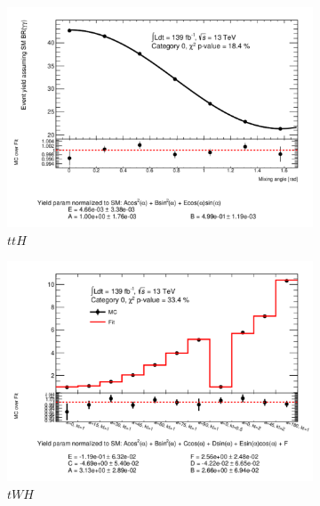 \begin{figure}[htp]
  \centering
       \begin{subfigure}[b]{0.3\textwidth}
         \centering
         \includegraphics[width=\textwidth]{figures/tthcp_results/yield_ttH_0.pdf}
         \caption{$ttH$}
         \label{fig:ttHYield}
     \end{subfigure}
     \hfill
         \begin{subfigure}[b]{0.3\textwidth}
         \centering
         \includegraphics[width=\textwidth]{figures/tthcp_results/yield_tWH_0.pdf}
         \caption{$tWH$}
      \label{fig:tWHYield}
     \end{subfigure}
     \hfill 
        \begin{subfigure}[b]{0.3\textwidth}
         \centering

\end{subfigure}
\end{figure}
